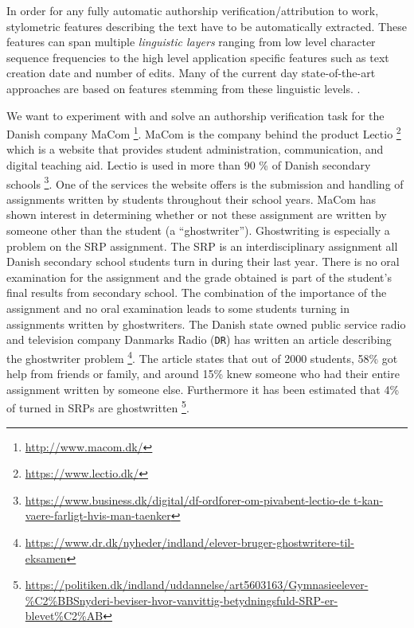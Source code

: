 In order for any fully automatic authorship verification/attribution to work,
stylometric features describing the text have to be automatically extracted.
These features can span multiple \textit{linguistic layers} ranging from low
level character sequence frequencies to the high level application specific
features such as text creation date and number of edits. Many of the current day
state-of-the-art approaches are based on features stemming from these
linguistic levels. \citep{stamatos2009}.


We want to experiment with and solve an authorship verification task for the
Danish company MaCom \footnote{\url{http://www.macom.dk/}}. MaCom is the company
behind the product Lectio \footnote{\url{https://www.lectio.dk/}} which is
a website that provides student administration, communication, and digital
teaching aid. Lectio is used in more than 90 \% of Danish secondary schools
\footnote{\url{https://www.business.dk/digital/df-ordforer-om-pivabent-lectio-de
t-kan-vaere-farligt-hvis-man-taenker}}. One of the services the website offers
is the submission and handling of assignments written by students throughout
their school years. MaCom has shown interest in determining whether or not these
assignment are written by someone other than the student (a ``ghostwriter'').
Ghostwriting is especially a problem on the \gls{SRP} assignment. The \gls{SRP}
is an interdisciplinary assignment all Danish secondary school students turn in
during their last year. There is no oral examination for the assignment and the
grade obtained is part of the student's final results from secondary school.
The combination of the importance of the assignment and no oral examination
leads to some students turning in assignments written by ghostwriters. The
Danish state owned public service radio and television company Danmarks Radio
(\texttt{DR}) has written an article describing the ghostwriter problem
\footnote{\url{https://www.dr.dk/nyheder/indland/elever-bruger-ghostwritere-til-
eksamen}}. The article states that out of 2000 students, 58\% got
help from friends or family, and around 15\% knew someone who had
their entire assignment written by someone else. Furthermore it has
been estimated that 4\% of turned in \glspl{SRP} are ghostwritten
\footnote{\url{https://politiken.dk/indland/uddannelse/art5603163/Gymnasieelever-\%C2\%BBSnyderi-beviser-hvor-vanvittig-betydningsfuld-SRP-er-blevet\%C2\%AB}}.

